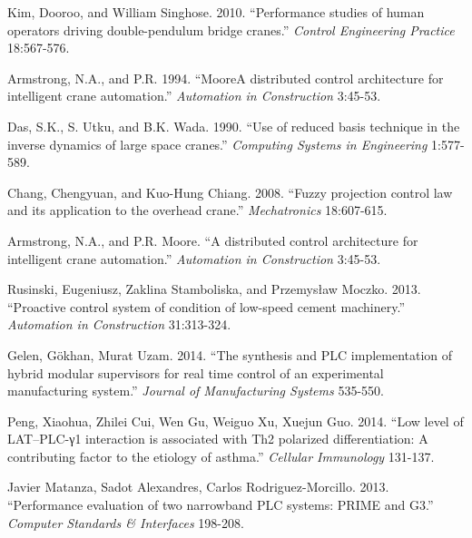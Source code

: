 \documentclass[a4paper]{article}
\begin{document}
\setlength{\hangindent}{4em}
Kim, Dooroo, and William Singhose. 2010. ``Performance studies of human operators driving double-pendulum bridge cranes.''
\textit{Control Engineering Practice} 18:567-576. \par

\setlength{\hangindent}{4em}
Armstrong, N.A., and P.R. 1994. ``MooreA distributed control architecture for intelligent crane automation.''
\textit{Automation in Construction} 3:45-53. \par

\setlength{\hangindent}{4em}
Das, S.K., S. Utku, and B.K. Wada. 1990. ``Use of reduced basis technique in the inverse dynamics of large space cranes.''
\textit{Computing Systems in Engineering} 1:577-589. \par

\setlength{\hangindent}{4em}
Chang, Chengyuan, and Kuo-Hung Chiang. 2008. ``Fuzzy projection control law and its application to the overhead crane.''
\textit{Mechatronics} 18:607-615. \par

\setlength{\hangindent}{4em}
Armstrong, N.A., and P.R. Moore. ``A distributed control architecture for intelligent crane automation.''
\textit{Automation in Construction} 3:45-53. \par

\setlength{\hangindent}{4em}
Rusinski, Eugeniusz, Zaklina Stamboliska, and Przemysław Moczko. 2013. ``Proactive control system of condition of low-speed cement machinery.''
\textit{Automation in Construction} 31:313-324. \par

\setlength{\hangindent}{4em}
Gelen, Gökhan, Murat Uzam. 2014. ``The synthesis and PLC implementation of hybrid modular supervisors for real time control of an experimental manufacturing system.''
\textit{Journal of Manufacturing Systems} 535-550. \par

\setlength{\hangindent}{4em}
Peng, Xiaohua, Zhilei Cui, Wen Gu, Weiguo Xu, Xuejun Guo. 2014. ``Low level of LAT–PLC-γ1 interaction is associated with Th2 polarized differentiation: A contributing factor to the etiology of asthma.''
\textit{Cellular Immunology} 131-137. \par

\setlength{\hangindent}{4em}
Javier Matanza, Sadot Alexandres, Carlos Rodriguez-Morcillo. 2013. ``Performance evaluation of two narrowband PLC systems: PRIME and G3.''
\textit{Computer Standards \& Interfaces} 198-208. \par
\end{document}
